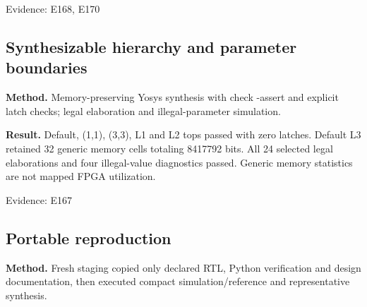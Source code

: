 \documentclass[11pt,a4paper]{article}
\begin{document}
{\small Evidence: E168,\allowbreak{} E170}

\subsection{Synt\allowbreak{}hesi\allowbreak{}zabl\allowbreak{}e hier\allowbreak{}arch\allowbreak{}y and para\allowbreak{}mete\allowbreak{}r boun\allowbreak{}dari\allowbreak{}es}

\textbf{Method.} Memo\allowbreak{}ry-pres\allowbreak{}ervi\allowbreak{}ng Yosy\allowbreak{}s synt\allowbreak{}hesi\allowbreak{}s with chec\allowbreak{}k -asse\allowbreak{}rt and expl\allowbreak{}icit latc\allowbreak{}h chec\allowbreak{}ks; lega\allowbreak{}l elab\allowbreak{}orat\allowbreak{}ion and ille\allowbreak{}gal-para\allowbreak{}mete\allowbreak{}r simu\allowbreak{}lati\allowbreak{}on.

\textbf{Result.} Defa\allowbreak{}ult,\allowbreak{} (\allowbreak{}1,\allowbreak{}1)\allowbreak{},\allowbreak{} (\allowbreak{}3,\allowbreak{}3)\allowbreak{},\allowbreak{} L1 and L2 tops pass\allowbreak{}ed with zero latc\allowbreak{}hes. Defa\allowbreak{}ult L3 reta\allowbreak{}ined 32 gene\allowbreak{}ric memo\allowbreak{}ry cell\allowbreak{}s tota\allowbreak{}ling 8417\allowbreak{}792 bits. All 24 sele\allowbreak{}cted lega\allowbreak{}l elab\allowbreak{}orat\allowbreak{}ions and four ille\allowbreak{}gal-valu\allowbreak{}e diag\allowbreak{}nost\allowbreak{}ics pass\allowbreak{}ed. Gene\allowbreak{}ric memo\allowbreak{}ry stat\allowbreak{}isti\allowbreak{}cs are not mapp\allowbreak{}ed FPGA util\allowbreak{}izat\allowbreak{}ion.

{\small Evidence: E167}

\subsection{Port\allowbreak{}able repr\allowbreak{}oduc\allowbreak{}tion}

\textbf{Method.} Fres\allowbreak{}h stag\allowbreak{}ing copi\allowbreak{}ed only decl\allowbreak{}ared RTL,\allowbreak{} Pyth\allowbreak{}on veri\allowbreak{}fica\allowbreak{}tion and desi\allowbreak{}gn docu\allowbreak{}ment\allowbreak{}atio\allowbreak{}n,\allowbreak{} then exec\allowbreak{}uted comp\allowbreak{}act simu\allowbreak{}lati\allowbreak{}on/\allowbreak{}refe\allowbreak{}renc\allowbreak{}e and repr\allowbreak{}esen\allowbreak{}tati\allowbreak{}ve synt\allowbreak{}hesi\allowbreak{}s.
\end{document}
